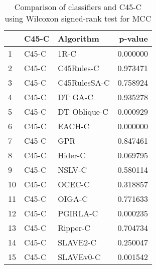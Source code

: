 \begin{table}
\footnotesize
\caption{Comparison of classifiers and C45-C using Wilcoxon signed-rank test for MCC}
\label{tab:C45-C wilcoxon MCC comparison}
\begin{tabular}{lllr}
\hline
 & C45-C & Algorithm & p-value \\
\hline
1 & C45-C & 1R-C & 0.000000 \\
2 & C45-C & C45Rules-C & 0.973471 \\
3 & C45-C & C45RulesSA-C & 0.758924 \\
4 & C45-C & DT GA-C & 0.935278 \\
5 & C45-C & DT Oblique-C & 0.000929 \\
6 & C45-C & EACH-C & 0.000000 \\
7 & C45-C & GPR & 0.847461 \\
8 & C45-C & Hider-C & 0.069795 \\
9 & C45-C & NSLV-C & 0.580114 \\
10 & C45-C & OCEC-C & 0.318857 \\
11 & C45-C & OIGA-C & 0.771633 \\
12 & C45-C & PGIRLA-C & 0.000235 \\
13 & C45-C & Ripper-C & 0.704734 \\
14 & C45-C & SLAVE2-C & 0.250047 \\
15 & C45-C & SLAVEv0-C & 0.001542 \\
\hline
\end{tabular}
\end{table}
